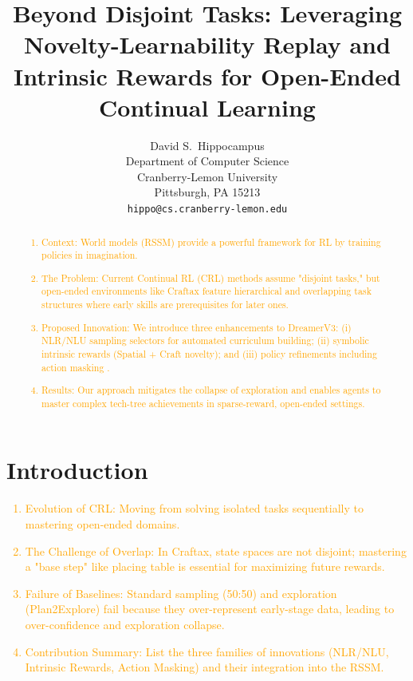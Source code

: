 \documentclass{article}
\title{Beyond Disjoint Tasks: Leveraging Novelty-Learnability Replay and Intrinsic Rewards for Open-Ended Continual Learning}
\author{%
  David S.~Hippocampus \\
  Department of Computer Science\\
  Cranberry-Lemon University\\
  Pittsburgh, PA 15213 \\
  \texttt{hippo@cs.cranberry-lemon.edu} \\
}
\begin{document}
\maketitle

\begin{abstract}
\textcolor{orange}{
\begin{enumerate}
    \item Context: World models (RSSM) provide a powerful framework for RL by training policies in imagination.
    \item The Problem: Current Continual RL (CRL) methods assume "disjoint tasks," but open-ended environments like Craftax feature hierarchical and overlapping task structures where early skills are prerequisites for later ones.
    \item Proposed Innovation: We introduce three enhancements to DreamerV3: (i) NLR/NLU sampling selectors for automated curriculum building; (ii) symbolic intrinsic rewards (Spatial + Craft novelty); and (iii) policy refinements including action masking .
    \item Results: Our approach mitigates the collapse of exploration and enables agents to master complex tech-tree achievements in sparse-reward, open-ended settings.
\end{enumerate}
}

\end{abstract}

\section{Introduction}
\label{sec:intro}
\textcolor{orange}{
\begin{enumerate}
    \item Evolution of CRL: Moving from solving isolated tasks sequentially to mastering open-ended domains.
    \item The Challenge of Overlap: In Craftax, state spaces are not disjoint; mastering a "base step" like placing table is essential for maximizing future rewards.
    \item Failure of Baselines: Standard sampling (50:50) and exploration (Plan2Explore) fail because they over-represent early-stage data, leading to over-confidence and exploration collapse.
    \item Contribution Summary: List the three families of innovations (NLR/NLU, Intrinsic Rewards, Action Masking) and their integration into the RSSM.
\end{enumerate}
}
\end{document}
